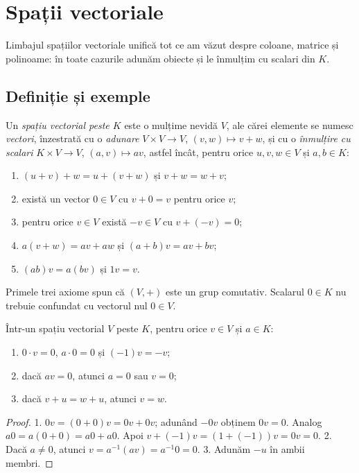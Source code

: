 \chapter{Spații vectoriale}\label{ch:spatii}

Limbajul spațiilor vectoriale unifică tot ce am văzut despre coloane, matrice și polinoame: în toate cazurile adunăm obiecte și le înmulțim cu scalari din $K$.

\section{Definiție și exemple}

\begin{definitie}
Un \emph{spațiu vectorial peste $K$} este o mulțime nevidă $V$, ale cărei elemente se numesc \emph{vectori}, înzestrată cu o \emph{adunare} $V\times V\to V$, $(v,w)\mapsto v+w$, și cu o \emph{înmulțire cu scalari} $K\times V\to V$, $(a,v)\mapsto av$, astfel încât, pentru orice $u,v,w\in V$ și $a,b\in K$:
\begin{enumerate}
\item $(u+v)+w=u+(v+w)$ și $v+w=w+v$;
\item există un vector $0\in V$ cu $v+0=v$ pentru orice $v$;
\item pentru orice $v\in V$ există $-v\in V$ cu $v+(-v)=0$;
\item $a(v+w)=av+aw$ și $(a+b)v=av+bv$;
\item $(ab)v=a(bv)$ și $1v=v$.
\end{enumerate}
\end{definitie}

Primele trei axiome spun că $(V,+)$ este un grup comutativ. Scalarul $0\in K$ nu trebuie confundat cu vectorul nul $0\in V$.

\begin{propozitie}
Într-un spațiu vectorial $V$ peste $K$, pentru orice $v\in V$ și $a\in K$:
\begin{enumerate}
\item $0\cdot v=0$, $a\cdot 0=0$ și $(-1)v=-v$;
\item dacă $av=0$, atunci $a=0$ sau $v=0$;
\item dacă $v+u=w+u$, atunci $v=w$.
\end{enumerate}
\end{propozitie}

\begin{proof}
1. $0v=(0+0)v=0v+0v$; adunând $-0v$ obținem $0v=0$. Analog $a0=a(0+0)=a0+a0$. Apoi $v+(-1)v=(1+(-1))v=0v=0$.
2. Dacă $a\neq0$, atunci $v=a^{-1}(av)=a^{-1}0=0$.
3. Adunăm $-u$ în ambii membri.
\end{proof}

